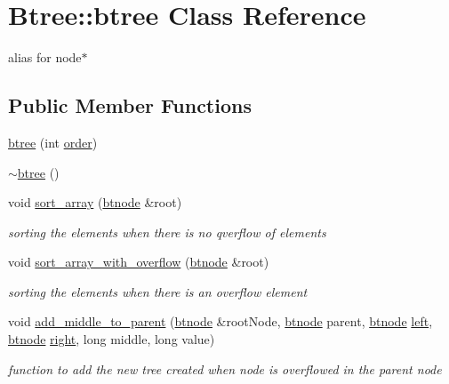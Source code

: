 \hypertarget{class_btree_1_1btree}{\section{Btree\-:\-:btree Class Reference}
\label{class_btree_1_1btree}
}


alias for node$\ast$  


\subsection*{Public Member Functions}
\begin{DoxyCompactItemize}
\item 
\hyperlink{class_btree_1_1btree_af49c8e8848fa656ea52358bf838a8dfe}{btree} (int \hyperlink{class_btree_1_1btree_aebbdfbfb5bbb9069158193873af48102}{order})
\item 
\hyperlink{class_btree_1_1btree_a48ca76221e799c22c12df8f4ab160248}{$\sim$btree} ()
\item 
void \hyperlink{class_btree_1_1btree_a5efd9c69bf410db08f1e15fee4abcd9e}{sort\-\_\-array} (\hyperlink{namespace_btree_af2177a710b4e16aaf0c14dcbbc01a9af}{btnode} \&root)
\begin{DoxyCompactList}\small\item\em sorting the elements when there is no qverflow of elements \end{DoxyCompactList}\item 
void \hyperlink{class_btree_1_1btree_ab90d77c7c4b3f7fb21223c19f3ac9459}{sort\-\_\-array\-\_\-with\-\_\-overflow} (\hyperlink{namespace_btree_af2177a710b4e16aaf0c14dcbbc01a9af}{btnode} \&root)
\begin{DoxyCompactList}\small\item\em sorting the elements when there is an overflow element \end{DoxyCompactList}\item 
void \hyperlink{class_btree_1_1btree_a4927846ed4f2301b0951e598f4d0a330}{add\-\_\-middle\-\_\-to\-\_\-parent} (\hyperlink{namespace_btree_af2177a710b4e16aaf0c14dcbbc01a9af}{btnode} \&root\-Node, \hyperlink{namespace_btree_af2177a710b4e16aaf0c14dcbbc01a9af}{btnode} parent, \hyperlink{namespace_btree_af2177a710b4e16aaf0c14dcbbc01a9af}{btnode} \hyperlink{class_btree_1_1btree_ac87987e8e86b424c75a859b1517e29d1}{left}, \hyperlink{namespace_btree_af2177a710b4e16aaf0c14dcbbc01a9af}{btnode} \hyperlink{class_btree_1_1btree_a36d46e46beffb8eca651db720fbd9f2e}{right}, long middle, long value)
\begin{DoxyCompactList}\small\item\em function to add the new tree created when node is overflowed in the parent node \end{DoxyCompactList}\item 

\end{DoxyCompactItemize}
